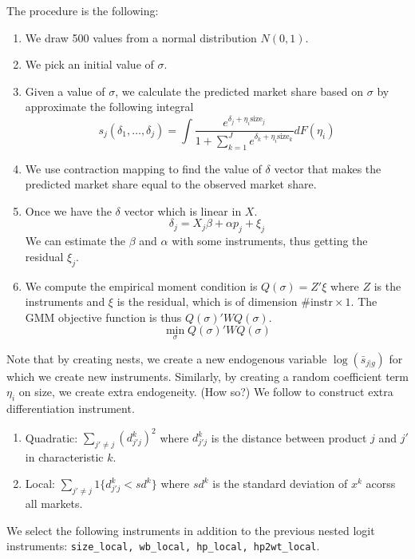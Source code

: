 \documentclass[12pt]{article}[margin=1in]
\begin{document}
The procedure is the following:
\begin{enumerate}
    \item We draw 500 values from a normal distribution $N(0,1)$.
    \item We pick an initial value of $\sigma$.
    \item Given a value of $\sigma$, we calculate the predicted market share based on
          $\sigma$ by approximate the following integral
          \begin{equation*}
              s_j(\delta_1,\ldots,\delta_j)=\int \frac{e^{\delta_j+\eta_i\text{size}_j}}{1+\sum_{k=1}^{J}e^{\delta_k+\eta_i\text{size}_k}}dF(\eta_i)
          \end{equation*}
    \item We use contraction mapping to find the value of $\delta$ vector that makes the
          predicted market share equal to the observed market share.
    \item Once we have the $\delta$ vector which is linear in $X$.
          \begin{equation*}
              \delta_j=X_j\beta+\alpha p_j+\xi_j
          \end{equation*}
          We can estimate the $\beta$ and $\alpha$ with some instruments, thus getting the residual $\xi_j$.
    \item We compute the empirical moment condition is $Q(\sigma)=Z'\xi$ where $Z$ is the
          instruments and $\xi$ is the residual, which is of dimension $ \# \text{instr}
              \times 1$. The GMM objective function is thus $Q(\sigma)'WQ(\sigma)$.
          \begin{equation*}
              \min_{\sigma} Q(\sigma)'WQ(\sigma)
          \end{equation*}
\end{enumerate}

Note that by creating nests, we create a new endogenous variable
$\log(\bar{s}_{j|g})$ for which we create new instruments. Similarly, by
creating a random coefficient term $\eta_i$ on size, we create extra
endogeneity. (How so?) We follow \citet{gandhihoude2019measuring} to construct
extra differentiation instrument.
\begin{enumerate}
    \item Quadratic: $\sum_{j' \neq j} (d_{j'j}^k)^2$ where $d_{j'j}^k$ is the distance
          between product $j$ and $j'$ in characteristic $k$.
    \item Local: $\sum_{j' \neq j} 1\{d_{j'j}^k < sd^k\}$ where $sd^k$ is the standard
          deviation of $x^k$ acorss all markets.
\end{enumerate}
We select the following instruments in addition to the previous nested logit
instruments: \verb|size_local, wb_local, hp_local, hp2wt_local|.
\end{document}
